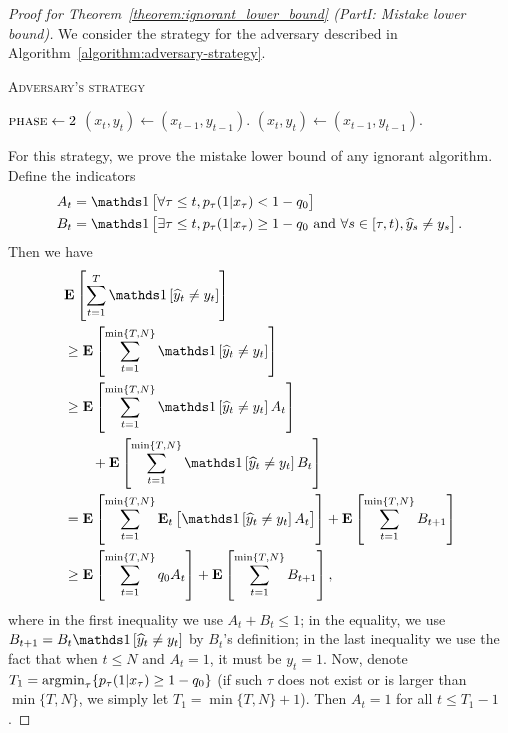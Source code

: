 \begin{proof}[Proof for Theorem~\ref{theorem:ignorant_lower_bound} (PartI: Mistake lower bound)]
We consider the strategy for the adversary described in Algorithm~\ref{algorithm:adversary-strategy}.
\begin{algorithm}[h]
\caption{\textsc{Adversary's strategy}}
\label{algorithm:adversary-strategy}
\begin{algorithmic}[1]
{
       \ELSE
          \STATE $\textsc{phase}\leftarrow 2$
       \ENDIF
       \STATE $(x_t, y_t)\leftarrow (x_{t-1}, y_{t-1})$.
    \ENDIF
\ENDFOR
{}
    \STATE $(x_t, y_t)\leftarrow (x_{t-1}, y_{t-1})$.
\ENDFOR


}
\end{algorithmic}
\end{algorithm}
For this strategy, we prove the mistake lower bound of any ignorant algorithm.
Define the indicators
\begin{align*}
A_t &= \indicator{\forall \tau\le t, p_\tau(1|x_\tau)<1-q_0} \\
B_t &= \indicator{\exists \tau\le t, p_\tau(1|x_\tau)\ge 1-q_0
 \text{\ and\ } \forall s\in[\tau,t), \widehat y_s \neq y_s}.
\end{align*}
Then we have
\begin{align}
& \mathbf{E}\left[\sum_{t=1}^{T} \indicator{\widehat y_t\neq y_t}\right] \nonumber \\
& \ge \mathbf{E}\left[\sum_{t=1}^{\min\{T,N\}} \indicator{\widehat y_t\neq y_t}\right] \nonumber \\
& \ge \mathbf{E}\left[\sum_{t=1}^{\min\{T,N\}} \indicator{\widehat y_t\neq y_t}A_t\right] \nonumber \\
& \qquad + \mathbf{E}\left[\sum_{t=1}^{\min\{T,N\}} \indicator{\widehat y_t\neq y_t}B_t\right] \nonumber \\
& = \mathbf{E}\left[\sum_{t=1}^{\min\{T,N\}} \mathbf{E}_t\left[\indicator{\widehat y_t\neq y_t}A_t\right]\right] + \mathbf{E}\left[\sum_{t=1}^{\min\{T,N\}} B_{t+1}\right] \nonumber \\
& \ge \mathbf{E}\left[\sum_{t=1}^{\min\{T,N\}} q_0 A_t\right] + \mathbf{E}\left[\sum_{t=1}^{\min\{T,N\}} B_{t+1}\right],
\label{equation:mistake_lower_bound_temp}
\end{align}
where in the first inequality we use $A_t+B_t\le 1$; in the equality, we use
$B_{t+1}=B_t\indicator{\widehat y_t\neq y_t}$ by $B_t$'s definition; in the last
inequality we use the fact that when $t\le N$ and $A_t=1$, it must be $y_t=1$.
Now, denote $T_1 = \operatorname*{argmin}_{\tau} \{ p_\tau(1|x_\tau) \ge 1-q_0 \}$ (if such
$\tau$ does not exist or is larger than $\min\{T,N\}$, we simply let
$T_1=\min\{T,N\}+1$). Then $A_t=1$ for all $t\le T_1-1$.


\end{proof}
